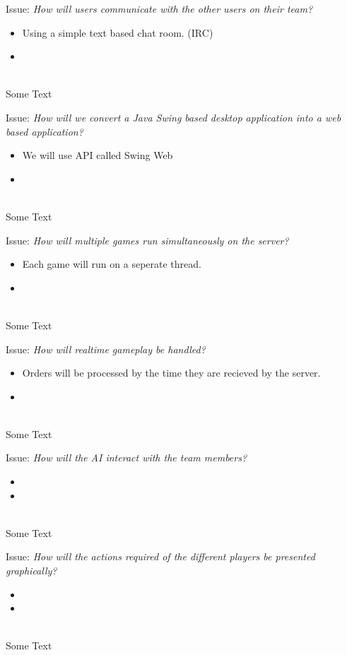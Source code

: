 Issue: \textit{How will users communicate with the other users on their team?}
\\
  \begin{itemize}
    \item Using a simple text based chat room. (IRC)
    \item 
  \end{itemize}
\\
Some Text

Issue: \textit{How will we convert a Java Swing based desktop application into a web based application?}
\\
  \begin{itemize}
    \item We will use API called Swing Web
    \item 
  \end{itemize}
\\
Some Text

Issue: \textit{How will multiple games run simultaneously on the server?}
\\
  \begin{itemize}
    \item Each game will run on a seperate thread.
    \item 
  \end{itemize}
\\
Some Text

Issue: \textit{How will realtime gameplay be handled?}
\\
  \begin{itemize}
    \item Orders will be processed by the time they are recieved by the server.
    \item 
  \end{itemize}
\\
Some Text

Issue: \textit{How will the AI interact with the team members?}
\\
  \begin{itemize}
    \item 
    \item 
  \end{itemize}
\\
Some Text

Issue: \textit{How will the actions required of the different players be presented graphically?}
\\
  \begin{itemize}
    \item 
    \item 
  \end{itemize}
\\
Some Text
